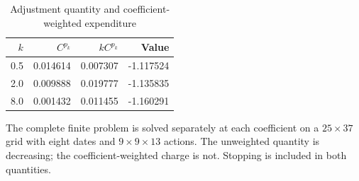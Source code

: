 \begin{table}[t]
\centering
\caption{Adjustment quantity and coefficient-weighted expenditure}
\label{tab:r5_effort}
\small
\begin{tabular}{rrrr}
\toprule
$k$ & $C^{p_k}$ & $kC^{p_k}$ & Value \\
\midrule
0.5 & 0.014614 & 0.007307 & -1.117524 \\
2.0 & 0.009888 & 0.019777 & -1.135835 \\
8.0 & 0.001432 & 0.011455 & -1.160291 \\
\bottomrule
\end{tabular}
\par\medskip
\begin{minipage}{.97\linewidth}
\footnotesize The complete finite problem is solved separately at each coefficient on a $25\times37$ grid with eight dates and $9\times9\times13$ actions. The unweighted quantity is decreasing; the coefficient-weighted charge is not. Stopping is included in both quantities.
\end{minipage}
\end{table}
